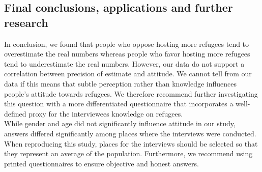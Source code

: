 \subsection{Final conclusions, applications and further research}

In conclusion, we found that people who oppose hosting more refugees tend to overestimate the real numbers whereas people who favor hosting more refugees tend to underestimate the real numbers. However, our data do not support a correlation between precision of estimate and attitude. We cannot tell from our data if this means that subtle perception rather than knowledge influences people's attitude towards refugees. We therefore recommend further investigating this question with a more differentiated questionnaire that incorporates a well-defined proxy for the interviewees knowledge on refugees.\\
While gender and age did not significantly influence attitude in our study, answers differed significantly among places where the interviews were conducted. When reproducing this study, places for the interviews should be selected so that they represent an average of the population. Furthermore, we recommend using printed questionnaires to ensure objective and honest answers.
